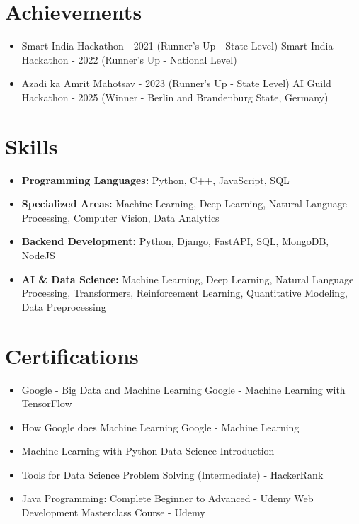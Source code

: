 \documentclass[a4paper,10pt]{article}
\begin{document}
\section*{Achievements}
\begin{itemize}
\item Smart India Hackathon - 2021 (Runner's Up - State Level) \hfill Smart India Hackathon - 2022 (Runner's Up - National Level)
\item Azadi ka Amrit Mahotsav - 2023 (Runner's Up - State Level) \hfill AI Guild Hackathon - 2025 (Winner - Berlin and Brandenburg State, Germany)
\end{itemize}

\section*{Skills}
\begin{itemize}
  \item \textbf{Programming Languages:} Python, C++, JavaScript, SQL
  \item \textbf{Specialized Areas:} Machine Learning, Deep Learning, Natural Language Processing, Computer Vision, Data Analytics
  \item \textbf{Backend Development:} Python, Django, FastAPI, SQL, MongoDB, NodeJS
  \item \textbf{AI \& Data Science:} Machine Learning, Deep Learning, Natural Language Processing, Transformers, Reinforcement Learning, Quantitative Modeling, Data Preprocessing
\end{itemize}

\section*{Certifications}
\begin{itemize}
\item Google - Big Data and Machine Learning \hfill Google - Machine Learning with TensorFlow
\item How Google does Machine Learning \hfill Google - Machine Learning
\item Machine Learning with Python \hfill Data Science Introduction
\item Tools for Data Science \hfill Problem Solving (Intermediate) - HackerRank
\item Java Programming: Complete Beginner to Advanced - Udemy \hfill Web Development Masterclass Course - Udemy
\end{itemize}
\end{document}
